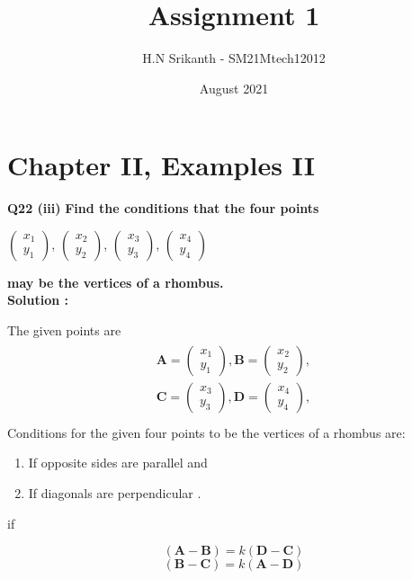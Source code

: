 \documentclass{article}
\title{\textbf{\Huge Assignment 1}}
\author{\large H.N Srikanth - SM21Mtech12012}
\date{August 2021}
\begin{document}
\providecommand{\mbf}{\mathbf}

\newcommand{\myvec}[1]{\ensuremath{\begin{pmatrix}#1\end{pmatrix}}}
\let\vec\mathbf

\maketitle

\section*{Chapter II, Examples II}
\textbf{Q22 (iii)}
\textbf{Find the conditions that the four points}

\myvec{x_1\\y_1}, \myvec{x_2\\y_2},
\myvec{x_3\\y_3}, \myvec{x_4\\y_4}

\textbf{ may be the vertices of a rhombus.}\\

\textbf{Solution :}

The given points are
\begin{align*}
\begin{split}
\vec{A} = \myvec{x_1\\y_1}, \vec{B} =\myvec{x_2\\y_2},\\
\vec{C} =\myvec{x_3\\y_3}, \vec{D} =\myvec{x_4\\y_4},\\
\end{split}
\end{align*}
Conditions for the given four points to be the vertices of a rhombus are:
\begin{enumerate}
  \item If opposite sides are parallel and
  \item If diagonals are perpendicular .
\end{enumerate}
if

\begin{equation}\label{first_equation}
(\vec{A}-\vec{B} ) = k(\vec{D}-\vec{C} )
\end{equation}
\begin{equation}\label{second_equation}
(\vec{B}-\vec{C} )=k(\vec{A}-\vec{D} )
\end{equation}
\end{document}
